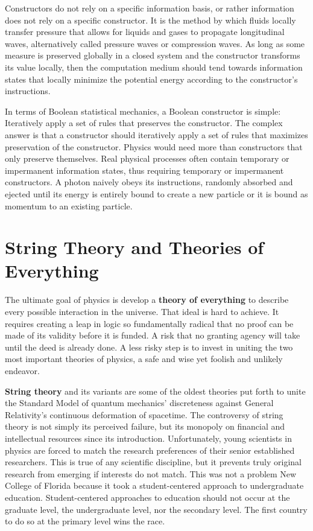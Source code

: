\documentclass[10pt, a5paper, twoside, openright]{memoir}
\begin{document}
Constructors do not rely on a specific information basis, or rather information does not rely on a specific constructor. It is the method by which fluids locally transfer pressure that allows for liquids and gases to propagate longitudinal waves, alternatively called pressure waves or compression waves. As long as some measure is preserved globally in a closed system and the constructor transforms its value locally, then the computation medium should tend towards information states that locally minimize the potential energy according to the constructor's instructions.

In terms of Boolean statistical mechanics, a Boolean constructor is simple: Iteratively apply a set of rules that preserves the constructor. The complex answer is that a constructor should iteratively apply a set of rules that maximizes preservation of the constructor. Physics would need more than constructors that only preserve themselves. Real physical processes often contain temporary or impermanent information states, thus requiring temporary or impermanent constructors. A photon naively obeys its instructions, randomly absorbed and ejected until its energy is entirely bound to create a new particle or it is bound as momentum to an existing particle.

\section{String Theory and Theories of Everything}

The ultimate goal of physics is develop a \textbf{theory of everything} to describe every possible interaction in the universe. That ideal is hard to achieve. It requires creating a leap in logic so fundamentally radical that no proof can be made of its validity before it is funded. A risk that no granting agency will take until the deed is already done. A less risky step is to invest in uniting the two most important theories of physics, a safe and wise yet foolish and unlikely endeavor.

\textbf{String theory} and its variants are some of the oldest theories put forth to unite the Standard Model of quantum mechanics' discreteness against General Relativity's continuous deformation of spacetime. The controversy of string theory is not simply its perceived failure, but its monopoly on financial and intellectual resources since its introduction. Unfortunately, young scientists in physics are forced to match the research preferences of their senior established researchers. This is true of any scientific discipline, but it prevents truly original research from emerging if interests do not match. This was not a problem New College of Florida because it took a student-centered approach to undergraduate education. Student-centered approaches to education should not occur at the graduate level, the undergraduate level, nor the secondary level. The first country to do so at the primary level wins the race.
\end{document}
